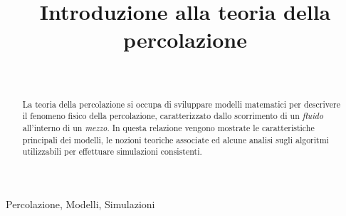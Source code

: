 \documentclass[journal]{IEEEtran}
\theoremstyle{definition}
\begin{document}
\title{Introduzione alla teoria della percolazione}

\author{
\\
}

\maketitle

\begin{abstract}
	La teoria della percolazione si occupa di sviluppare modelli matematici per descrivere il 
	fenomeno fisico della percolazione, caratterizzato dallo scorrimento di un \textit{fluido} 
	all'interno di un \textit{mezzo}. In questa relazione vengono mostrate le caratteristiche
	principali dei modelli, le nozioni teoriche associate ed alcune analisi sugli algoritmi 
	utilizzabili per effettuare simulazioni consistenti.   
\end{abstract}

\begin{IEEEkeywords}
Percolazione, Modelli, Simulazioni
\end{IEEEkeywords}




% 
% 



\end{document}

